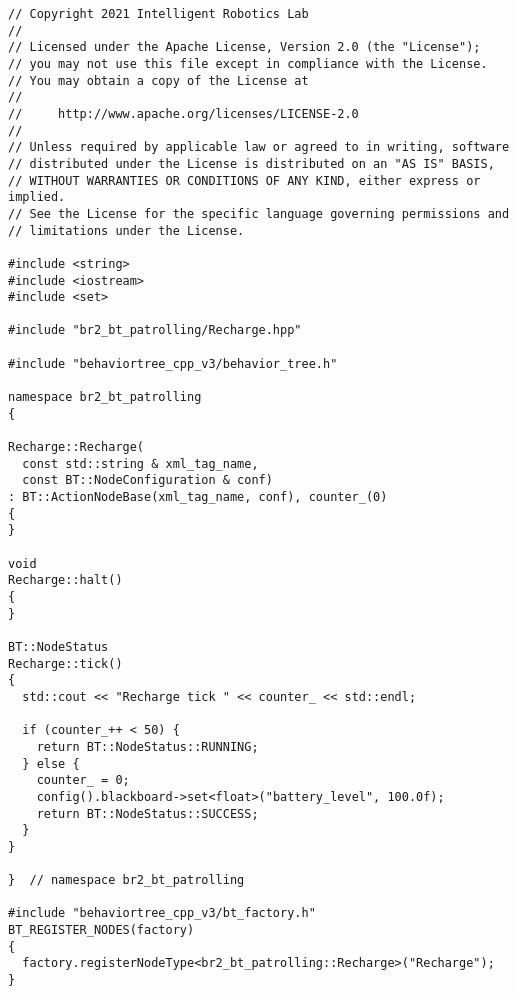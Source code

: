  \footnotesize
\begin{tcolorbox}[sharp corners, colframe=gray!80, colback=LightGray, left=0pt, top=0pt, bottom=0pt, title=\texttt{br2\_bt\_patrolling/src/br2\_bt\_patrolling/Recharge.cpp}]
  \begin{verbatim}
// Copyright 2021 Intelligent Robotics Lab
//
// Licensed under the Apache License, Version 2.0 (the "License");
// you may not use this file except in compliance with the License.
// You may obtain a copy of the License at
//
//     http://www.apache.org/licenses/LICENSE-2.0
//
// Unless required by applicable law or agreed to in writing, software
// distributed under the License is distributed on an "AS IS" BASIS,
// WITHOUT WARRANTIES OR CONDITIONS OF ANY KIND, either express or implied.
// See the License for the specific language governing permissions and
// limitations under the License.

#include <string>
#include <iostream>
#include <set>

#include "br2_bt_patrolling/Recharge.hpp"

#include "behaviortree_cpp_v3/behavior_tree.h"

namespace br2_bt_patrolling
{

Recharge::Recharge(
  const std::string & xml_tag_name,
  const BT::NodeConfiguration & conf)
: BT::ActionNodeBase(xml_tag_name, conf), counter_(0)
{
}

void
Recharge::halt()
{
}

BT::NodeStatus
Recharge::tick()
{
  std::cout << "Recharge tick " << counter_ << std::endl;

  if (counter_++ < 50) {
    return BT::NodeStatus::RUNNING;
  } else {
    counter_ = 0;
    config().blackboard->set<float>("battery_level", 100.0f);
    return BT::NodeStatus::SUCCESS;
  }
}

}  // namespace br2_bt_patrolling

#include "behaviortree_cpp_v3/bt_factory.h"
BT_REGISTER_NODES(factory)
{
  factory.registerNodeType<br2_bt_patrolling::Recharge>("Recharge");
}
    \end{verbatim}
    \end{tcolorbox}
  \normalsize

